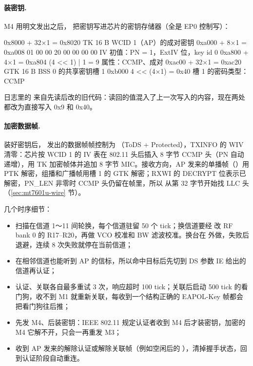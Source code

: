 \paragraph{装密钥.} M4 用明文发出之后， 把密钥写进芯片的密钥存储器（全是 EP0 控制写）：
\begin{txtcode}
0x8000 + 32×1 = 0x8020   TK 16 B                    WCID 1（AP）的成对密钥
0xa000 +  8×1 = 0xa008   01 00 00 20 00 00 00 00     IV 初值：PN = 1，ExtIV 位，key id 0
0xa800 +  4×1 = 0xa804   (4 << 1) | 1 = 9           属性：CCMP、成对
0xac00 + 32×1 = 0xac20   GTK 16 B                    BSS 0 的共享密钥槽 1
0xb000                   4 << (4×1) = 0x40          槽 1 的密码类型：CCMP
\end{txtcode}
日志里的  来自先读后改的旧代码：读回的值混入了上一次写入的内容，现在两处都改为直接写入 0x9 和 0x40。

\paragraph{加密数据帧.} 装好密钥后， 发出的数据帧帧控制为 （ToDS + Protected），TXINFO 的 WIV 清零：芯片按 WCID 1 的 IV 表在 802.11 头后插入 8 字节 CCMP 头（PN 自动递增），用 TK 加密帧体并追加 8 字节 MIC。接收方向，AP 发来的单播帧（）用 PTK 解密，组播和广播帧用槽 1 的 GTK 解密；RXWI 的 DECRYPT 位表示已解密，PN\_LEN 非零时 CCMP 头仍留在帧里，所以  从第 32 字节开始找 LLC 头（\ref{sec:mt7601u-wire} 节）。

几个时序细节：

\begin{itemize}
  \item 扫描在信道 1～11 间轮换，每个信道驻留 50 个 tick；换信道要经  改 RF bank 0 的 R17--R20，再做 VCO 校准和 BW 滤波校准。换台在  外做，失败后退避，连续 8 次失败就停在当前信道；
  \item 在相邻信道也能听到 AP 的信标，所以命中目标后先切到 DS 参数 IE 给出的信道再认证；
  \item 认证、关联各自最多重试 3 次，响应超时 100 tick；关联后启动 500 tick 的看门狗，收不到 M1 就重新关联，每收到一个结构正确的 EAPOL-Key 帧都会把看门狗往后推；
  \item 先发 M4、后装密钥：IEEE 802.11 规定认证者收到 M4 后才装密钥，加密的 M4 它解不开，只会一再重发 M3；
  \item 收到 AP 发来的解除认证或解除关联帧（例如空闲后的 ），清掉握手状态，回到认证阶段自动重连。
\end{itemize}

